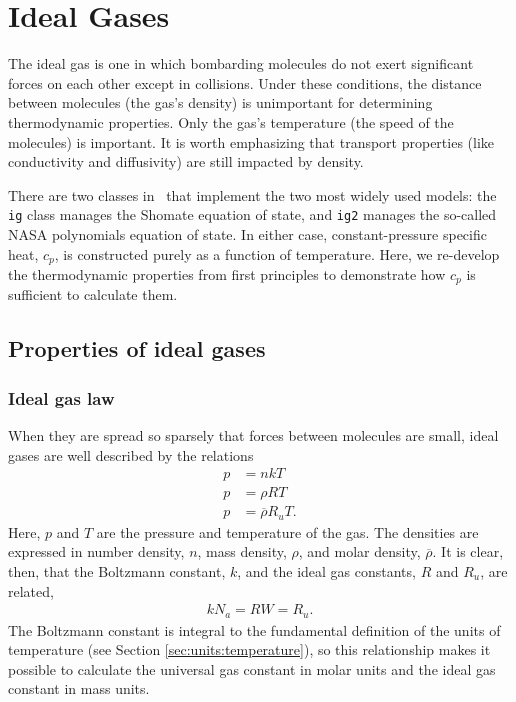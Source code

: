 \chapter{Ideal Gases}\label{ch:ig}

The ideal gas is one in which bombarding molecules do not exert significant forces on each other except in collisions.  Under these conditions, the distance between molecules (the gas's density) is unimportant for determining thermodynamic properties.  Only the gas's temperature (the speed of the molecules) is important.  It is worth emphasizing that transport properties (like conductivity and diffusivity) are still impacted by density.

There are two classes in \PM\ that implement the two most widely used models: the \verb|ig| class manages the Shomate equation of state, and \verb|ig2| manages the so-called NASA polynomials equation of state.  In either case, constant-pressure specific heat, $c_p$, is constructed purely as a function of temperature.  Here, we re-develop the thermodynamic properties from first principles to demonstrate how $c_p$ is sufficient to calculate them.

\section{Properties of ideal gases}

\subsection{Ideal gas law}\label{sec:iglaw}

When they are spread so sparsely that forces between molecules are small, ideal gases are well described by the relations
\begin{subequations}
\begin{align}
p &= n k T\label{eqn:ig:k}\\
p &= \rho R T\label{eqn:ig:r}\\
p &= \overline{\rho} R_u T\label{eqn:ig:ru}.
\end{align}
\end{subequations}
Here, $p$ and $T$ are the pressure and temperature of the gas.  The densities are expressed in number density, $n$, mass density, $\rho$, and molar density, $\overline{\rho}$.  It is clear, then, that the Boltzmann constant, $k$, and the ideal gas constants, $R$ and $R_u$, are related,
\begin{align}
k N_a = R W = R_u.
\end{align}
The Boltzmann constant is integral to the fundamental definition of the units of temperature (see Section \ref{sec:units:temperature}), so this relationship makes it possible to calculate the universal gas constant in molar units and the ideal gas constant in mass units.

